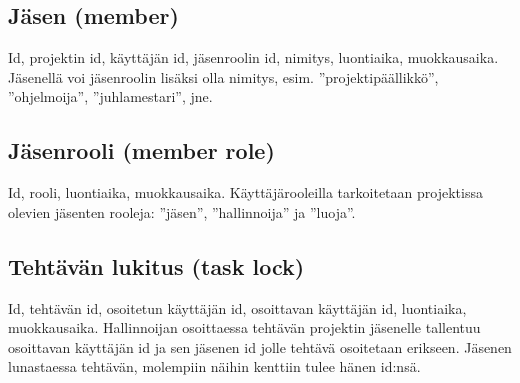 \documentclass[12pt,a4paper]{article}
\begin{document}
\subsection*{Jäsen (member)}
Id, projektin id, käyttäjän id, jäsenroolin id, nimitys, luontiaika, muokkausaika.
Jäsenellä voi jäsenroolin lisäksi olla nimitys, esim. ”projektipäällikkö”, ”ohjelmoija”, ”juhlamestari”,
jne.
\subsection*{Jäsenrooli (member role)}
Id, rooli, luontiaika, muokkausaika.
Käyttäjärooleilla tarkoitetaan projektissa olevien jäsenten rooleja: ”jäsen”, ”hallinnoija” ja ”luoja”.
\subsection*{Tehtävän lukitus (task lock)}
Id, tehtävän id, osoitetun käyttäjän id, osoittavan käyttäjän id, luontiaika, muokkausaika.
Hallinnoijan osoittaessa tehtävän projektin jäsenelle tallentuu osoittavan käyttäjän id ja sen jäsenen
id jolle tehtävä osoitetaan erikseen. Jäsenen lunastaessa tehtävän, molempiin näihin kenttiin tulee hänen
id:nsä.
\end{document}
